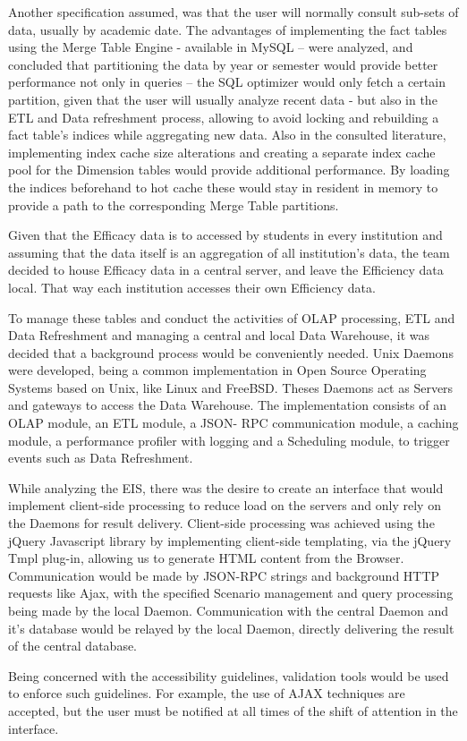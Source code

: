 Another specification assumed, was that the user will normally consult sub-sets
of data, usually by academic date. The advantages of implementing the fact
tables using the Merge Table Engine - available in MySQL – were analyzed, and
concluded that partitioning the data by year or semester would provide better
performance not only in queries – the SQL optimizer would only fetch a certain
partition, given that the user will usually analyze recent data - but also in
the ETL and Data refreshment process, allowing to avoid locking and rebuilding a
fact table's indices while aggregating new data. Also in the consulted
literature, implementing index cache size alterations and creating a separate
index cache pool for the Dimension tables would provide additional performance.
By loading the indices beforehand to hot cache these would stay in resident in
memory to provide a path to the corresponding Merge Table partitions. 

Given that the Efficacy data is to accessed by students in every institution and
assuming that the data itself is an aggregation of all institution's data, the
team decided to house Efficacy data in a central server, and leave the
Efficiency data local. That way each institution accesses their own Efficiency
data. 

To manage these tables and conduct the activities of OLAP processing, ETL and
Data Refreshment and managing a central and local Data Warehouse, it was decided
that a background process would be conveniently needed. Unix Daemons were
developed, being a common implementation in Open Source Operating Systems based
on Unix, like Linux and FreeBSD. Theses Daemons act as Servers and gateways to
access the Data Warehouse. The implementation consists of an OLAP module, an ETL
module, a JSON- RPC communication module, a caching module, a performance
profiler with logging and a Scheduling module, to trigger events such as Data
Refreshment.

While analyzing the EIS, there was the desire to create an interface that would
implement client-side processing to reduce load on the servers and only rely on
the Daemons for result delivery. Client-side processing was achieved using the
jQuery Javascript library by implementing client-side templating, via the jQuery
Tmpl plug-in, allowing us to generate HTML content from the Browser.
Communication would be made by JSON-RPC strings and background HTTP requests
like Ajax, with the specified Scenario management and query processing being
made by the local Daemon. Communication with the central Daemon and it's
database would be relayed by the local Daemon, directly delivering the result of
the central database. 

Being concerned with the accessibility guidelines, validation tools would be
used to enforce such guidelines. For example, the use of AJAX techniques are
accepted, but the user must be notified at all times of the shift of attention
in the interface.
